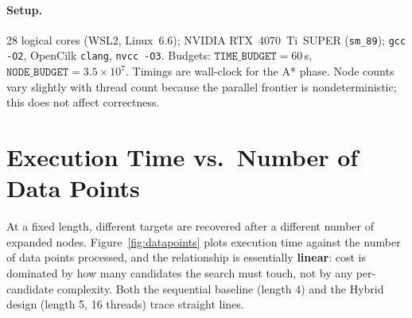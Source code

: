 \documentclass[11pt,a4paper]{article}
\begin{document}
\paragraph{Setup.} 28 logical cores (WSL2, Linux~6.6); NVIDIA RTX~4070~Ti~SUPER (\texttt{sm\_89});
\texttt{gcc -O2}, OpenCilk \texttt{clang}, \texttt{nvcc -O3}. Budgets:
$\texttt{TIME\_BUDGET}=60$\,s, $\texttt{NODE\_BUDGET}=3.5\times10^{7}$. Timings are wall-clock for the
A* phase. Node counts vary slightly with thread count because the parallel frontier is
nondeterministic; this does not affect correctness.

\section{Execution Time vs.\ Number of Data Points}
At a fixed length, different targets are recovered after a different number of expanded nodes.
Figure~\ref{fig:datapoints} plots execution time against the number of data points processed, and
the relationship is essentially \textbf{linear}: cost is dominated by how many candidates the search
must touch, not by any per-candidate complexity. Both the sequential baseline (length 4) and the
Hybrid design (length 5, 16 threads) trace straight lines.
\end{document}
